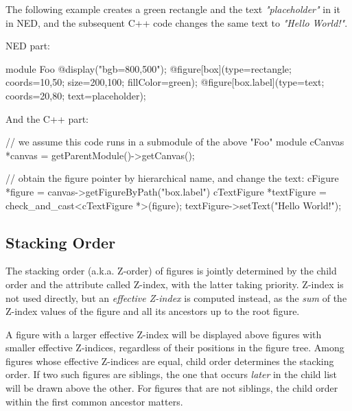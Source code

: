 The following example creates a green rectangle and the text
\textit{"placeholder"} in it in NED, and the subsequent C++ code changes
the same text to \textit{"Hello World!"}.

NED part:

\begin{ned}
module Foo
{
    @display("bgb=800,500");
    @figure[box](type=rectangle; coords=10,50; size=200,100; fillColor=green);
    @figure[box.label](type=text; coords=20,80; text=placeholder);
}
\end{ned}

And the C++ part:

\begin{cpp}
// we assume this code runs in a submodule of the above "Foo" module
cCanvas *canvas = getParentModule()->getCanvas();

// obtain the figure pointer by hierarchical name, and change the text:
cFigure *figure = canvas->getFigureByPath("box.label")
cTextFigure *textFigure = check_and_cast<cTextFigure *>(figure);
textFigure->setText("Hello World!");
\end{cpp}


\subsection{Stacking Order}
\label{sec:graphics:canvas-stacking-order}

The stacking order (a.k.a. Z-order) of figures is jointly determined by the
child order and the  attribute called Z-index, with
the latter taking priority. Z-index is not used  directly, but an
\textit{effective Z-index} is computed instead, as the \textit{sum}
of the Z-index values of the figure and all its ancestors up to the root figure.

A figure with a larger effective Z-index will be displayed above figures with
smaller effective Z-indices, regardless of their positions in the figure tree.
Among figures whose effective Z-indices are equal, child order determines
the stacking order. If two such figures are siblings, the one that occurs
\textit{later} in the child list will be drawn above the other.
For figures that are not siblings, the child order within the first
common ancestor matters.


